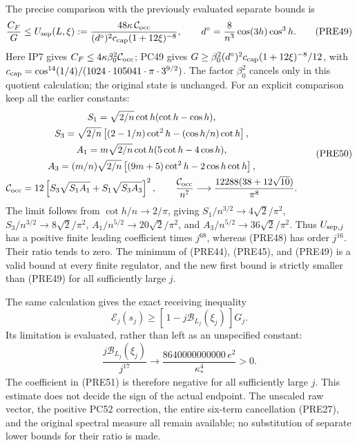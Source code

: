 \documentclass[11pt]{article}
\begin{document}
The precise comparison with the previously evaluated separate bounds is
\[
 \frac{C_F}{G}
 \le U_{\rm sep}(L,\xi):=
 \frac{48\kappa\,\mathcal C_{\rm occ}}
 {(d^\circ)^2c_{\rm cap}(1+12\xi)^{-8}},
 \qquad
 d^\circ=\frac8{n^3}\cos(3h)\cos^3h.
 \tag{PRE49}
\]
Here IP7 gives \(C_F\le4\kappa\beta_0^2\mathcal C_{\rm occ}\);
PC49 gives \(G\ge\beta_0^2(d^\circ)^2
c_{\rm cap}(1+12\xi)^{-8}/12\), with
\(c_{\rm cap}=\cos^{14}(1/4)/(1024\cdot105041\cdot\pi\cdot3^{9/2})\).
The factor \(\beta_0^2\) cancels only in this quotient calculation; the original state is unchanged.
For an explicit comparison keep all the earlier constants:
\[
 \begin{gathered}
 S_1=\sqrt{2/n}\cot h(\cot h-\cos h),\\
 S_3=\sqrt{2/n}\left[(2-1/n)\cot^2h-(\cos h/n)\cot h\right],\\
 A_1=m\sqrt{2/n}\cot h(5\cot h-4\cos h),\\
 A_3=(m/n)\sqrt{2/n}\left[(9m+5)\cot^2h-2\cos h\cot h\right],\\
 \mathcal C_{\rm occ}
  =12\left[S_3\sqrt{S_1A_1}+S_1\sqrt{S_3A_3}\right]^2,\qquad
 \frac{\mathcal C_{\rm occ}}{n^7}
       \longrightarrow\frac{12288(38+12\sqrt{10})}{\pi^8}.
 \end{gathered}\tag{PRE50}
\]
The limit follows from \(\cot h/n\to2/\pi\), giving
\(S_1/n^{3/2}\to4\sqrt2/\pi^2\),
\(S_3/n^{3/2}\to8\sqrt2/\pi^2\),
\(A_1/n^{5/2}\to20\sqrt2/\pi^2\), and
\(A_3/n^{5/2}\to36\sqrt2/\pi^2\).
Thus \(U_{{\rm sep},j}\) has a positive finite leading coefficient times \(j^{68}\), whereas (PRE48) has order \(j^{16}\). Their ratio tends to zero. The minimum of (PRE44), (PRE45), and (PRE49) is a valid bound at every finite regulator, and the new first bound is strictly smaller than (PRE49) for all sufficiently large \(j\).

The same calculation gives the exact receiving inequality
\[
 \boxed{\displaystyle
 \mathscr E_j(s_j)\ge
       [\,1-j\mathcal B_{L_j}(\xi_j)\,]G_j.}
 \tag{PRE51}
\]
Its limitation is evaluated, rather than left as an unspecified constant:
\[
 \frac{j\mathcal B_{L_j}(\xi_j)}{j^{17}}
       \longrightarrow\frac{8640000000000\,e^2}{\kappa_*^4}>0.
 \tag{PRE52}
\]
The coefficient in (PRE51) is therefore negative for all sufficiently large \(j\). This estimate does not decide the sign of the actual endpoint. The unscaled raw vector, the positive PC52 correction, the entire six-term cancellation (PRE27), and the original spectral measure all remain available; no substitution of separate lower bounds for their ratio is made.
\end{document}
